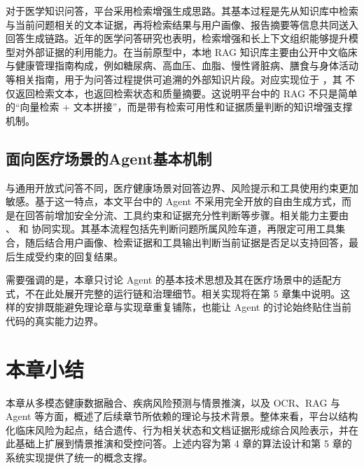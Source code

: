 对于医学知识问答，平台采用检索增强生成思路。其基本过程是先从知识库中检索与当前问题相关的文本证据，再将检索结果与用户画像、报告摘要等信息共同送入回答生成链路。近年的医学问答研究也表明，检索增强和长上下文组织能够提升模型对外部证据的利用能力\cite{zhang2025medicalrag}。在当前原型中，本地 RAG 知识库主要由公开中文临床与健康管理指南构成，例如糖尿病、高血压、血脂、慢性肾脏病、膳食与身体活动等相关指南，用于为问答过程提供可追溯的外部知识片段\cite{cds2020t2d_guideline,hypertension2024cn,lipid2023cn,ckd2022cn,dietary2022cn,physicalactivity2021cn}。对应实现位于 ，其  不仅返回检索文本，也返回检索状态和质量摘要。这说明平台中的 RAG 不只是简单的“向量检索 + 文本拼接”，而是带有检索可用性和证据质量判断的知识增强支撑机制。

\subsection{面向医疗场景的Agent基本机制}
与通用开放式问答不同，医疗健康场景对回答边界、风险提示和工具使用约束更加敏感。基于这一特点，本文平台中的 Agent 不采用完全开放的自由生成方式，而是在回答前增加安全分流、工具约束和证据充分性判断等步骤。相关能力主要由 、 和  协同实现。其基本流程包括先判断问题所属风险车道，再限定可用工具集合，随后结合用户画像、检索证据和工具输出判断当前证据是否足以支持回答，最后生成受约束的回复结果。

需要强调的是，本章只讨论 Agent 的基本技术思想及其在医疗场景中的适配方式，不在此处展开完整的运行链和治理细节。相关实现将在第 5 章集中说明。这样的安排既能避免理论章与实现章重复铺陈，也能让 Agent 的讨论始终贴住当前代码的真实能力边界。

\section{本章小结}
本章从多模态健康数据融合、疾病风险预测与情景推演，以及 OCR、RAG 与 Agent 等方面，概述了后续章节所依赖的理论与技术背景。整体来看，平台以结构化临床风险为起点，结合遗传、行为相关状态和文档证据形成综合风险表示，并在此基础上扩展到情景推演和受控问答。上述内容为第 4 章的算法设计和第 5 章的系统实现提供了统一的概念支撑。
